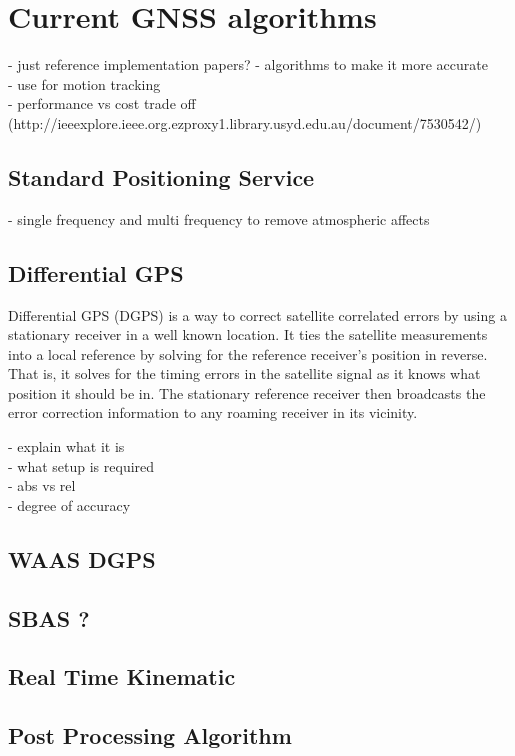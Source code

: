 
\section{Current GNSS algorithms}
- just reference implementation papers?
- algorithms to make it more accurate\\
- use for motion tracking\\
- performance vs cost trade off\\
(http://ieeexplore.ieee.org.ezproxy1.library.usyd.edu.au/document/7530542/)
\subsection{Standard Positioning Service}
- single frequency and multi frequency to remove atmospheric affects

\subsection{Differential GPS}
Differential GPS (DGPS) is a way to correct satellite correlated errors by using a stationary receiver in a well known location. It ties the satellite measurements into a local reference by solving for the reference receiver's position in reverse. That is, it solves for the timing errors in the satellite signal as it knows what position it should be in. The stationary reference receiver then broadcasts the error correction information to any roaming receiver in its vicinity.


- explain what it is\\
- what setup is required \\
- abs vs rel \\
- degree of accuracy
\subsection{WAAS DGPS}

\subsection{SBAS  ?}

\subsection{Real Time Kinematic}

\subsection{Post Processing Algorithm}

